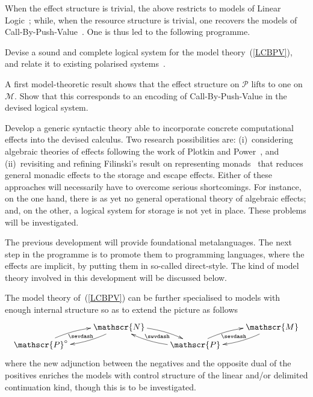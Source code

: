 \documentclass[11pt,twocolumn]{article}
\newcounter{CC}
\newenvironment{resenumerate}
  {\begin{list}{[\textbf{\arabic{CC}]}}
  {\usecounter{CC}
   \setlength{\topsep}{2pt}
   \setlength{\partopsep}{2pt}
   \setlength{\itemsep}{2.5pt}
   \setlength{\parsep}{2.5pt}
   \setlength{\leftmargin}{1.65em}
   \setlength{\labelwidth}{1.15em}
 }}
  {\end{list}}
\newcommand{\cat}[1]{\mathscr{#1}}
\newcommand{\op}{\circ}
\begin{document}
When the effect structure is trivial, the above restricts to models of Linear
Logic~\cite{MelliesCMLL}; while, when the resource structure is trivial, one
recovers the models of Call-By-Push-Value~\cite{LevyCBPV}.  One is thus led to
the following programme.
\begin{resenumerate}\setcounter{CC}{0}
\item\label{ItemOne}
  Devise a sound and complete logical system for the model
  theory~(\ref{LCBPV}), and relate it to existing polarised
  systems~\cite{Munch,CurienMunch}.
\item
  A first model-theoretic result shows that the effect structure on $\cat
  P$ lifts to one on $\cat M$.  Show that this corresponds to an encoding
  of Call-By-Push-Value in the devised logical system.
\item
  Develop a generic syntactic theory able to incorporate concrete
  computational effects into the devised calculus.  Two research possibilities
  are: (i)~considering algebraic theories of effects following the work of
  Plotkin and Power~\cite{PlotkinPowerAlgOpsAndGenEffs}, and
  (ii)~revisiting and refining Filinski's result on representing
  monads~\cite{Filinski} that reduces general monadic effects to the
  storage and escape effects.  Either of these approaches will necessarily
  have to overcome serious shortcomings.  For instance, on the one hand,
  there is as yet no general operational theory of algebraic effects; and,
  on the other, a logical system for storage is not yet in place.  These
  problems will be investigated.
\item\label{ItemFour}
  The previous development will provide foundational metalanguages.  The
  next step in the programme is to promote them to programming languages,
  where the effects are implicit, by putting them in so-called
  direct-style.  The kind of model theory involved in this development
  will be discussed below.
\end{resenumerate}

The model theory of~(\ref{LCBPV}) can be further specialised to
models with enough internal structure so as to extend the picture as
follows
\begin{equation}\label{LEEC}
  \begin{minipage}{\columnwidth}
  \xymatrix@R=5pt{
    & \ar@/^.75em/[dl] \ar@{}[dl]|-\sevdash \cat N \ar@/^.75em/[dr] &
    \ar@{}[rd]|-{\sevdash} \ar@{}[dl]|-{\swvdash} & \ar@/^.75em/[dl] \cat
    M \\
    \ar@/^.75em/[ur] \cat P^\op & & \ar@/^.75em/[lu] \cat P \ar@/^.75em/[ur] & 
  }\end{minipage}
\end{equation}
where the new adjunction between the negatives and the opposite dual of
the positives enriches the models with control structure of the
linear %
and/or delimited continuation %
kind, though this is to be investigated.
\end{document}
